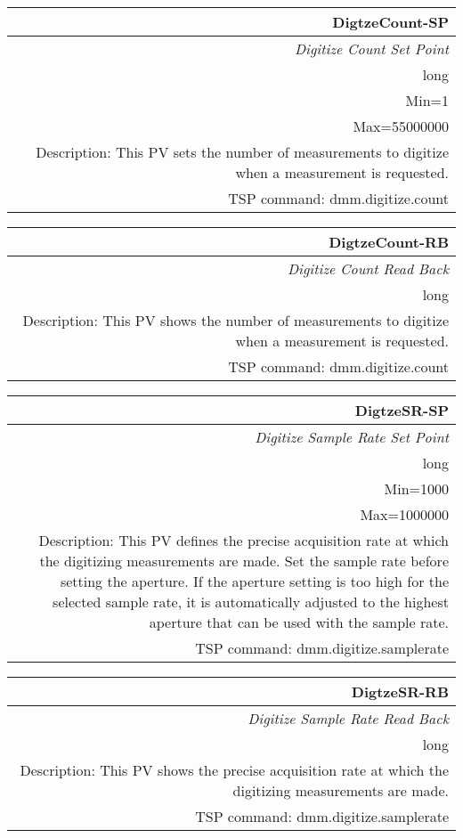 \documentclass[openany]{article}
\begin{document}
		\begin{tabular}{N}
			\hline
			\bfseries DigtzeCount-SP\label{pv:digtzecount-sp} \\ \hline
			\emph{Digitize Count Set Point} \\
			long \\
			Min=1 \\
			Max=55000000 \\
			Description: This PV sets the number of measurements to digitize when a measurement is requested. \\
			TSP command: dmm.digitize.count
		\end{tabular}

		\begin{tabular}{N}
			\hline
			\bfseries DigtzeCount-RB\label{pv:digtzecount-rb} \\ \hline
			\emph{Digitize Count Read Back} \\
			long \\
			Description: This PV shows the number of measurements to digitize when a measurement is requested. \\
			TSP command: dmm.digitize.count
		\end{tabular}

		\begin{tabular}{N}
			\hline
			\bfseries DigtzeSR-SP\label{pv:digtzesr-sp} \\ \hline
			\emph{Digitize Sample Rate Set Point} \\
			long \\
			Min=1000 \\
			Max=1000000 \\
			Description: This PV defines the precise acquisition rate at which the digitizing measurements are made. Set the sample rate before setting the aperture. If the aperture setting is too high for the selected sample rate, it is automatically adjusted to the highest aperture that can be used with the sample rate. \\
			TSP command: dmm.digitize.samplerate
		\end{tabular}

		\begin{tabular}{N}
			\hline
			\bfseries DigtzeSR-RB\label{pv:digtzesr-rb} \\ \hline
			\emph{Digitize Sample Rate Read Back} \\
			long \\
			Description: This PV shows the precise acquisition rate at which the digitizing measurements are made. \\
			TSP command: dmm.digitize.samplerate
		\end{tabular}
\end{document}
